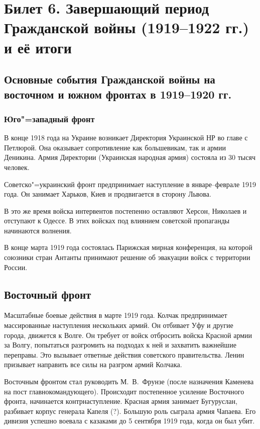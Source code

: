 \section{Билет 6. Завершающий период Гражданской войны (1919--1922 гг.) и её итоги}

\subsection{Основные события Гражданской войны на восточном и южном фронтах в 1919--1920 гг.}

\subsubsection{Юго"=западный фронт}

В конце 1918 года на Украине возникает Директория Украинской НР во главе с Петлюрой. Она оказывает сопротивление как большевикам, так и армии Деникина.
Армия Директории (Украинская народная армия) состояла из 30 тысяч человек.

Советско"=украинский фронт предпринимает наступление в январе--феврале 1919 года. Он занимает Харьков, Киев и продвигается в сторону Львова.

В это же время войска интервентов постепенно оставляют Херсон, Николаев и отступают к Одессе. В этих войсках под влиянием советской пропаганды начинаются волнения.

В конце марта 1919 года состоялась Парижская мирная конференция, на которой союзники стран Антанты принимают решение об эвакуации войск с территории России.

\subsection{Восточный фронт}
Масштабные боевые действия в марте 1919 года. Колчак предпринимает массированные наступления нескольких армий. Он отбивает Уфу и другие города, движется к Волге. Он требует от войск отбросить войска Красной армии за Волгу, попытаться разгромить на подходах к ней и захватить важнейшие переправы. Это вызывает ответные действия советского правительства. Ленин призывает направить все силы на разгром армий Колчака. 

Восточным фронтом стал руководить М.~В.~Фрунзе (после назначения Каменева на пост главнокомандующего). Происходит постепенное усиление Восточного фронта, начинается контрнаступление. Красная армия занимает Бугуруслан, разбивает корпус генерала Капеля (?). Большую роль сыграла армия Чапаева. Его дивизия успешно воевала с казаками до 5 сентября 1919 года, когда он был убит.

